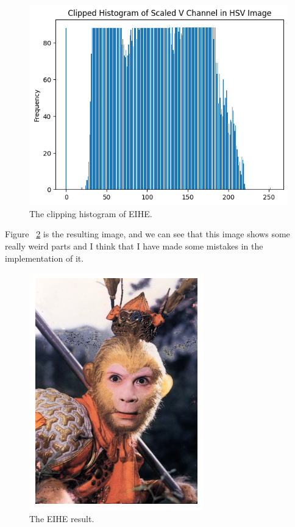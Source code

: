 \documentclass{article}
\begin{document}
	\begin{figure}[!h]
		\includegraphics[width=\linewidth]{img/EIHE_clipping_hist.png}
		\caption{The clipping histogram of EIHE.}
		\label{fig:EIHE_clipping_hist}
	\end{figure}
	
	Figure ~\ref{fig:EIHE} is the resulting image, and we can see that this image shows some really weird parts and I think that I have made some mistakes in the implementation of it.
	
	\begin{figure}
		\includegraphics[width=\linewidth]{img/EIHE.png}
		\caption{The EIHE result.}
		\label{fig:EIHE}
	\end{figure}
	
\end{document}
